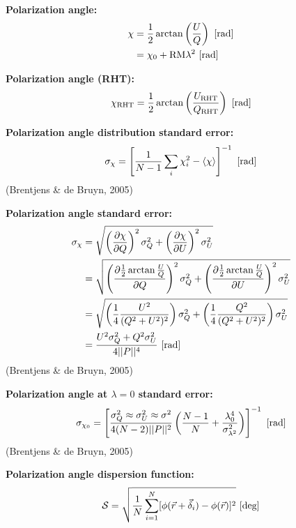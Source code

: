 \documentclass[a4paper,10pt]{article}
\begin{document}
{\noindent}\textbf{Polarization angle:}
\begin{align*}
\chi &= \dfrac{1}{2}\arctan\left(\dfrac{U}{Q}\right) ~ [{\rm rad}] \\
&= \chi_0 + \mathrm{RM}\lambda^2 ~ [{\rm rad}]
\end{align*}

{\noindent}\textbf{Polarization angle (RHT):}
\begin{align*}
\chi_\mathrm{RHT} = \dfrac{1}{2}\arctan\left(\dfrac{U_\mathrm{RHT}}{Q_\mathrm{RHT}}\right) ~ [{\rm rad}]
\end{align*}

{\noindent}\textbf{Polarization angle distribution standard error:} 
\begin{align*}
\sigma_\chi = \left[ \dfrac{1}{N-1} \sum_i\chi_i^2 - \langle\chi\rangle \right]^{-1} ~ [{\rm rad}]
\end{align*}
(Brentjens \& de Bruyn, 2005)

{\noindent}\textbf{Polarization angle standard error:}
\begin{align*}
\sigma_\chi &= \sqrt{ \left(\dfrac{\partial\chi}{\partial Q}\right)^2\sigma_Q^2 + \left(\dfrac{\partial\chi}{\partial U}\right)^2\sigma_U^2 }\\
&= \sqrt{ \left(\dfrac{\partial\frac{1}{2}\arctan\frac{U}{Q}}{\partial Q}\right)^2\sigma_Q^2 + \left(\dfrac{\partial\frac{1}{2}\arctan\frac{U}{Q}}{\partial U}\right)^2\sigma_U^2 } \\
&= \sqrt{ \left(\dfrac{1}{4}\dfrac{U^2}{(Q^2+U^2)^2}\right)\sigma_Q^2 + \left(\dfrac{1}{4}\dfrac{Q^2}{(Q^2+U^2)^2}\right)\sigma_U^2 } \\
&= \dfrac{U^2\sigma_Q^2 + Q^2\sigma_U^2}{4\lvert\lvert P \rvert\rvert^4} ~ [{\rm rad}]
\end{align*}
(Brentjens \& de Bruyn, 2005)

{\noindent}\textbf{Polarization angle at $\lambda=0$ standard error:} 
\begin{align*}
\sigma_{\chi_0} = \left[ \dfrac{\sigma_Q^2\approx\sigma_U^2\approx\sigma^2}{4(N-2)\lvert\lvert P \rvert\rvert^2} \left( \dfrac{N-1}{N} + \dfrac{\lambda_0^4}{\sigma_{\lambda^2}^2} \right) \right]^{-1} ~ [{\rm rad}]
\end{align*}
(Brentjens \& de Bruyn, 2005)

{\noindent}\textbf{Polarization angle dispersion function:}
\begin{align*}
	\mathcal{S} = \sqrt{ \frac{1}{N} \sum_{i=1}^N [\phi(\vec{r} + \vec{\delta}_i) - \phi(\vec{r})]^2 } ~ [\rm deg]
\end{align*}
\end{document}
